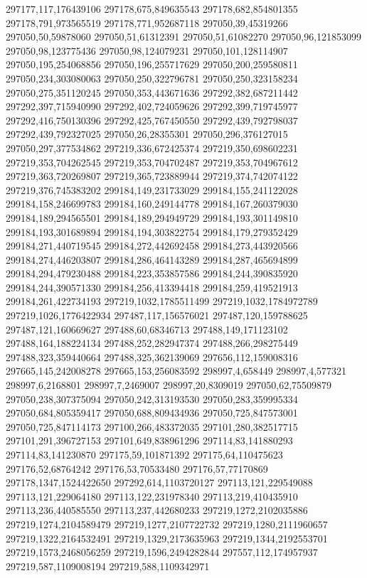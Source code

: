 297177,117,176439106
297178,675,849635543
297178,682,854801355
297178,791,973565519
297178,771,952687118
297050,39,45319266
297050,50,59878060
297050,51,61312391
297050,51,61082270
297050,96,121853099
297050,98,123775436
297050,98,124079231
297050,101,128114907
297050,195,254068856
297050,196,255717629
297050,200,259580811
297050,234,303080063
297050,250,322796781
297050,250,323158234
297050,275,351120245
297050,353,443671636
297292,382,687211442
297292,397,715940990
297292,402,724059626
297292,399,719745977
297292,416,750130396
297292,425,767450550
297292,439,792798037
297292,439,792327025
297050,26,28355301
297050,296,376127015
297050,297,377534862
297219,336,672425374
297219,350,698602231
297219,353,704262545
297219,353,704702487
297219,353,704967612
297219,363,720269807
297219,365,723889944
297219,374,742074122
297219,376,745383202
299184,149,231733029
299184,155,241122028
299184,158,246699783
299184,160,249144778
299184,167,260379030
299184,189,294565501
299184,189,294949729
299184,193,301149810
299184,193,301689894
299184,194,303822754
299184,179,279352429
299184,271,440719545
299184,272,442692458
299184,273,443920566
299184,274,446203807
299184,286,464143289
299184,287,465694899
299184,294,479230488
299184,223,353857586
299184,244,390835920
299184,244,390571330
299184,256,413394418
299184,259,419521913
299184,261,422734193
297219,1032,1785511499
297219,1032,1784972789
297219,1026,1776422934
297487,117,156576021
297487,120,159788625
297487,121,160669627
297488,60,68346713
297488,149,171123102
297488,164,188224134
297488,252,282947374
297488,266,298275449
297488,323,359440664
297488,325,362139069
297656,112,159008316
297665,145,242008278
297665,153,256083592
298997,4,658449
298997,4,577321
298997,6,2168801
298997,7,2469007
298997,20,8309019
297050,62,75509879
297050,238,307375094
297050,242,313193530
297050,283,359995334
297050,684,805359417
297050,688,809434936
297050,725,847573001
297050,725,847114173
297100,266,483372035
297101,280,382517715
297101,291,396727153
297101,649,838961296
297114,83,141880293
297114,83,141230870
297175,59,101871392
297175,64,110475623
297176,52,68764242
297176,53,70533480
297176,57,77170869
297178,1347,1524422650
297292,614,1103720127
297113,121,229549088
297113,121,229064180
297113,122,231978340
297113,219,410435910
297113,236,440585550
297113,237,442680233
297219,1272,2102035886
297219,1274,2104589479
297219,1277,2107722732
297219,1280,2111960657
297219,1322,2164532491
297219,1329,2173635963
297219,1344,2192553701
297219,1573,2468056259
297219,1596,2494282844
297557,112,174957937
297219,587,1109008194
297219,588,1109342971
